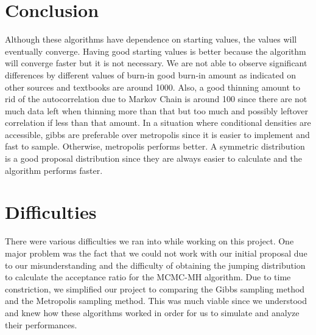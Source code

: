 \documentclass[11pt,a4paper]{article}
\begin{document}

\section*{Conclusion}
Although these algorithms have dependence on starting values, the values will eventually converge. Having good starting values is better because the algorithm will converge faster but it is not necessary. We are not able to observe significant differences by different values of burn-in good burn-in amount as indicated on other sources and textbooks are around 1000. Also, a good thinning amount to rid of the autocorrelation due to Markov Chain is around 100 since there are not much data left when thinning more than that but too much and possibly leftover correlation if less than that amount. In a situation where conditional densities are accessible, gibbs are preferable over metropolis since it is easier to implement and fast to sample. Otherwise, metropolis performs better. A symmetric distribution is a good proposal distribution since they are always easier to calculate and the algorithm performs faster. 


\section*{Difficulties}
There were various difficulties we ran into while working on this project. One major problem was the fact that we could not work with our initial proposal due to our misunderstanding and the difficulty of obtaining the jumping distribution to calculate the acceptance ratio for the MCMC-MH algorithm. Due to time constriction, we simplified our project to comparing the Gibbs sampling method and the Metropolis sampling method. This was much viable since we understood and knew how these algorithms worked in order for us to simulate and analyze their performances. 


\newpage
\end{document}
